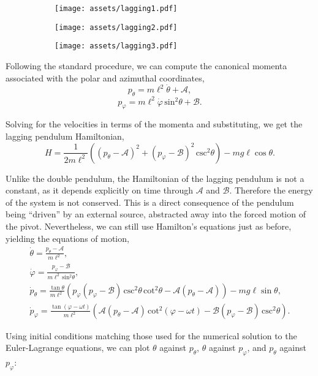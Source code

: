 \documentclass[11pt]{article}
\begin{document}
\begin{figure}[htbp]
\centering
\begin{subfigure}{110pt}
\texttt{[image: assets/lagging1.pdf]}
\end{subfigure}
\begin{subfigure}{110pt}
\texttt{[image: assets/lagging2.pdf]}
\end{subfigure}
\begin{subfigure}{110pt}
\texttt{[image: assets/lagging3.pdf]}
\end{subfigure}
\label{plot:lagging1}
\end{figure}

Following the standard procedure, we can compute the canonical momenta associated with the polar and azimuthal coordinates,
$$p_\theta=m\ell^2\dot{\theta}+\mathcal{A},$$
$$p_\varphi=m\ell^2\dot{\varphi}\,\text{sin}{}^2\theta+\mathcal{B}.$$

Solving for the velocities in terms of the momenta and substituting, we get the lagging pendulum Hamiltonian,
$$H=\frac{1}{2m\ell^2}\left(\left(p_\theta-\mathcal{A}\right)^2+\left(p_\varphi-\mathcal{B}\right)^2\,\text{csc}{}^2\theta\right)-mg\ell\cos\theta.$$

Unlike the double pendulum, the Hamiltonian of the lagging pendulum is not a constant, as it depends explicitly on time through $\mathcal{A}$ and $\mathcal{B}$. Therefore the energy of the system is not conserved. This is a direct consequence of the pendulum being ``driven'' by an external source, abstracted away into the forced motion of the pivot. Nevertheless, we can still use Hamilton's equations just as before, yielding the equations of motion,
{\small\begin{gather*}
\dot{\theta}=\frac{p_\theta-\mathcal{A}}{m\ell^2},\\[8pt]
\dot{\varphi}=\frac{p_\varphi-\mathcal{B}}{m\ell^2\,\text{sin}{}^2\theta},\\[8pt]
\dot{p}_\theta=\frac{\tan\theta}{m\ell^2}\left(p_\varphi\left(p_\varphi-\mathcal{B}\right)\,\text{csc}{}^2\theta\,\text{cot}{}^2\theta-\mathcal{A}\left(p_\theta-\mathcal{A}\right)\right)-mg\ell\sin\theta,\\[8pt]
\dot{p}_\varphi=\frac{\tan(\varphi-\omega t)}{m\ell^2}\left(\mathcal{A}\left(p_\theta-\mathcal{A}\right)\,\text{cot}{}^2(\varphi-\omega t)-\mathcal{B}\left(p_\varphi-\mathcal{B}\right)\,\text{csc}{}^2\theta\right).
\end{gather*}}
\newpage

Using initial conditions matching those used for the numerical solution to the Euler\hyp{}Lagrange equations, we can plot $\theta$ against $p_\theta$, $\theta$ against $p_\varphi$, and $p_\theta$ against $p_\varphi$:
\end{document}
